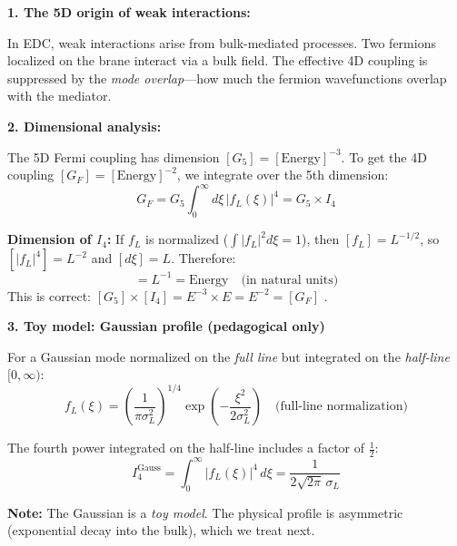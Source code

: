 \begin{tcolorbox}[colback=cyan!5, colframe=cyan!50!black,
  title={Quantitative Mode Overlap: Why $G_F \sim 10^{-5}$ GeV$^{-2}$?}, breakable]
\label{box:gf_mode_overlap}

\textbf{1. The 5D origin of weak interactions:}

In EDC, weak interactions arise from bulk-mediated processes. Two fermions localized
on the brane interact via a bulk field. The effective 4D coupling is suppressed by the
\emph{mode overlap}---how much the fermion wavefunctions overlap with the mediator.

\textbf{2. Dimensional analysis:}

The 5D Fermi coupling has dimension $[G_5] = [\text{Energy}]^{-3}$. To get the 4D
coupling $[G_F] = [\text{Energy}]^{-2}$, we integrate over the 5th dimension:
\begin{equation}
G_F = G_5 \int_0^\infty d\xi \, |f_L(\xi)|^4 = G_5 \times I_4
\end{equation}

\textbf{Dimension of $I_4$:} If $f_L$ is normalized ($\int |f_L|^2 d\xi = 1$),
then $[f_L] = L^{-1/2}$, so $[|f_L|^4] = L^{-2}$ and $[d\xi] = L$. Therefore:
\begin{equation}
[I_4] = L^{-1} = \text{Energy} \quad \text{(in natural units)}
\label{eq:ch3_I4_dimension}
\end{equation}
This is correct: $[G_5] \times [I_4] = E^{-3} \times E = E^{-2} = [G_F]$ \tagM{}.

\textbf{3. Toy model: Gaussian profile (pedagogical only)}

For a Gaussian mode normalized on the \emph{full line} but integrated on the
\emph{half-line} $[0,\infty)$:
\begin{equation}
f_L(\xi) = \left(\frac{1}{\pi \sigma_L^2}\right)^{1/4} \exp\left(-\frac{\xi^2}{2\sigma_L^2}\right)
\quad \text{(full-line normalization)}
\end{equation}

The fourth power integrated on the half-line includes a factor of $\frac{1}{2}$:
\begin{equation}
\boxed{
I_4^{\text{Gauss}} = \int_0^\infty |f_L(\xi)|^4 \, d\xi = \frac{1}{2\sqrt{2\pi}\,\sigma_L}
}
\label{eq:ch3_I4_gauss_halfline}
\end{equation}

\textbf{Note:} The Gaussian is a \emph{toy model}. The physical profile is asymmetric
(exponential decay into the bulk), which we treat next.


\end{tcolorbox}
